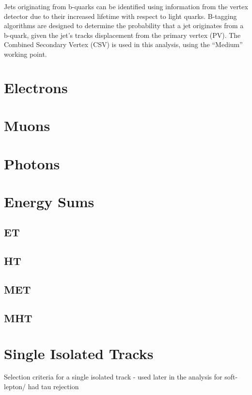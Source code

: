 Jets originating from b-quarks can be identified using information from the 
vertex detector due to their increased lifetime with respect to light quarks. 
B-tagging algorithms are designed to determine the probability that a jet 
originates from a b-quark, given the jet's tracks displacement from the primary 
vertex (PV). The Combined Secondary Vertex (CSV) is used in this analysis, using
the ``Medium'' working point.

\section{Electrons}  %
\label{sec:objects_electrons}


\section{Muons}  %
\label{sec:objects_muons}


\section{Photons}  %
\label{sec:objects_photons}


\section{Energy Sums}  %
\label{sec:objects_energy_sums}

\subsection{ET}
\subsection{HT}
\subsection{MET}
\subsection{MHT}

\section{Single Isolated Tracks}  %
\label{sec:objects_sit}
Selection criteria for a single isolated track - used later in the analysis for soft-lepton/
had tau rejection